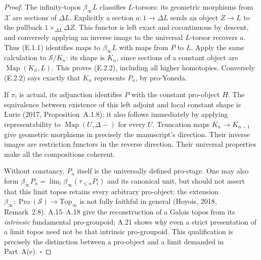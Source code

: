 \begin{proof}
The infinity-topos $\beta_\infty L$ classifies $L$-torsors: its geometric morphisms from $\mathcal X$ are sections of $\Delta L$. Explicitly a section $a:1\to\Delta L$ sends an object $Z\to L$ to the pullback $1\times_{\Delta L}\Delta Z$. This functor is left exact and cocontinuous by descent, and conversely applying an inverse image to the universal $L$-torsor recovers $a$. Thus (E.1.1) identifies maps to $\beta_\infty L$ with maps from $P$ to $L$. Apply the same calculation to $\mathcal S/K_n$: its shape is $K_n$, since sections of a constant object are $\operatorname{Map}(K_n,L)$. This proves (E.2.2), including all higher homotopies. Conversely (E.2.2) says exactly that $K_n$ represents $P_n$, by pro-Yoneda.

If $\pi_!$ is actual, its adjunction identifies $P$ with the constant pro-object $H$. The equivalence between existence of this left adjoint and local constant shape is Lurie (2017, Proposition~A.1.8); it also follows immediately by applying representability to $\operatorname{Map}(U,\Delta-)$ for every $U$. Truncation maps $K_n\to K_{n-1}$ give geometric morphisms in precisely the manuscript's direction. Their inverse images are restriction functors in the reverse direction. Their universal properties make all the compositions coherent.

Without constancy, $P_n$ itself is the universally defined pro-stage. One may also form $\beta_\infty P_n=\lim_i\beta_\infty(\tau_{\le n}P_i)$ and its canonical unit, but should not assert that this limit topos retains every arbitrary pro-object: the extension $\beta_\infty:\operatorname{Pro}(\mathcal S)\to\mathrm{Top}_\infty$ is not fully faithful in general (Hoyois, 2018, Remark~2.8). A.15--A.18 give the reconstruction of a Galois topos from its \emph{intrinsic} fundamental pro-groupoid; A.21 shows why even a strict presentation of a limit topos need not be that intrinsic pro-groupoid. This qualification is precisely the distinction between a pro-object and a limit demanded in Part~A(e). \hfill$\square$
\end{proof}

